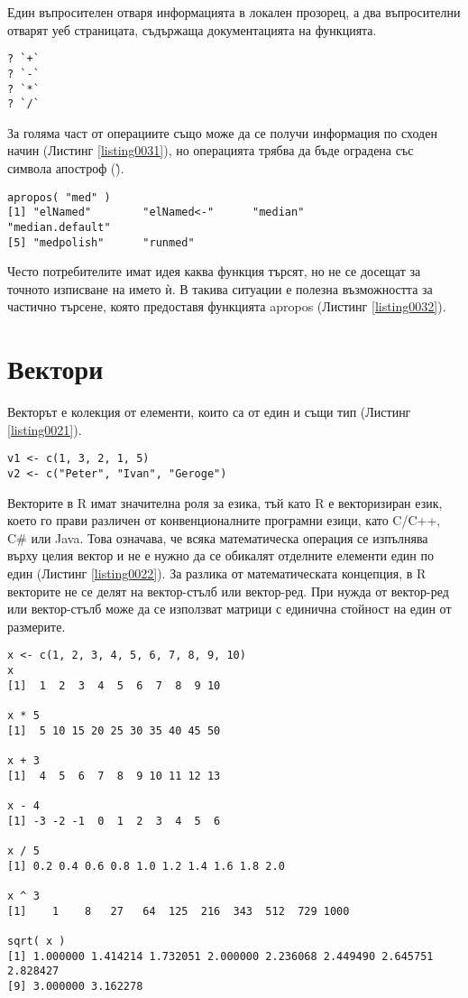 Един въпросителен отваря информацията в локален прозорец, а два въпросителни отварят уеб страницата, съдържаща документацията на функцията.

\begin{lstlisting}[caption=Документация за операции, label=listing0031]
? `+`
? `-`
? `*`
? `/`
\end{lstlisting}

За голяма част от операциите също може да се получи информация по сходен начин (Листинг \ref{listing0031}), но операцията трябва да бъде оградена със символа апостроф (\`).

\begin{lstlisting}[caption=Частично търсене, label=listing0032]
apropos( "med" )
[1] "elNamed"        "elNamed<-"      "median"         "median.default"
[5] "medpolish"      "runmed"
\end{lstlisting}

Често потребителите имат идея каква функция търсят, но не се досещат за точното изписване на името ѝ. В такива ситуации е полезна възможността за частично търсене, която предоставя функцията apropos (Листинг \ref{listing0032}).

\section{Вектори}

Векторът е колекция от елементи, които са от един и същи тип (Листинг \ref{listing0021}). 

\begin{lstlisting}[caption=Вектор от числа и вектор от символни низове, label=listing0021]
v1 <- c(1, 3, 2, 1, 5)
v2 <- c("Peter", "Ivan", "Geroge")
\end{lstlisting}

Векторите в R имат значителна роля за езика, тъй като R е векторизиран език, което го прави различен от конвенционалните програмни езици, като C/C++, C\# или Java. Това означава, че всяка математическа операция се изпълнява върху целия вектор и не е нужно да се обикалят отделните елементи един по един (Листинг \ref{listing0022}). За разлика от математическата концепция, в R векторите не се делят на вектор-стълб или вектор-ред. При нужда от вектор-ред или вектор-стълб може да се използват матрици с единична стойност на един от размерите.

\begin{lstlisting}[caption=Базови операции над вектори, label=listing0022]
x <- c(1, 2, 3, 4, 5, 6, 7, 8, 9, 10)
x
[1]  1  2  3  4  5  6  7  8  9 10

x * 5
[1]  5 10 15 20 25 30 35 40 45 50

x + 3
[1]  4  5  6  7  8  9 10 11 12 13

x - 4
[1] -3 -2 -1  0  1  2  3  4  5  6

x / 5
[1] 0.2 0.4 0.6 0.8 1.0 1.2 1.4 1.6 1.8 2.0

x ^ 3
[1]    1    8   27   64  125  216  343  512  729 1000

sqrt( x )
[1] 1.000000 1.414214 1.732051 2.000000 2.236068 2.449490 2.645751 2.828427
[9] 3.000000 3.162278
\end{lstlisting}

